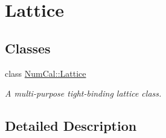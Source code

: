 \hypertarget{group__lattice}{\section{Lattice}
\label{group__lattice}
}
\subsection*{Classes}
\begin{DoxyCompactItemize}
\item 
class \hyperlink{classNumCal_1_1Lattice}{Num\+Cal\+::\+Lattice}
\begin{DoxyCompactList}\small\item\em A multi-\/purpose tight-\/binding lattice class. \end{DoxyCompactList}\end{DoxyCompactItemize}


\subsection{Detailed Description}
